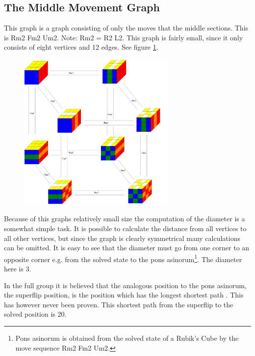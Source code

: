 \subsection{The Middle Movement Graph}
\label{sub:middleMoveGraph}
This graph is a \rubik{} graph consisting of only the moves that \twist{} the middle sections. 
This is Rm2 Fm2 Um2. Note: Rm2 = R2 L2.  This graph is fairly small, since it only consists of eight vertices and 12 edges. See figure \ref{fig:graphMiddleSlice2}. \cite[pp. 158-167]{Rubik87}

\begin{figure}[bht!]
	\centering
		\includegraphics[width = 0.7\textwidth]{input/pics/graphMiddleSlice2.PNG}
	\caption{}
	\label{fig:graphMiddleSlice2}
\end{figure}

Because of this graphs relatively small size the computation of the diameter is a somewhat simple task. It is possible to calculate the distance from all vertices to all other vertices, but since the graph is clearly symmetrical many calculations can be omitted. It is easy to see that the diameter must go from one corner to an opposite corner e.g. from the solved state to the pons asinorum\footnote{Pons asinorum is obtained from the solved state of a Rubik's Cube by the move sequence Rm2 Fm2 Um2.}. The diameter here is 3. 

In the full \rubik{} group it is believed that the analogous position to the pons asinorum, the superflip position, is the position which has the longest shortest path \cite{speedsolving.wiki}. This has however never been proven. This shortest path from the superflip to the solved position is 20\cite{rokicki09}.


